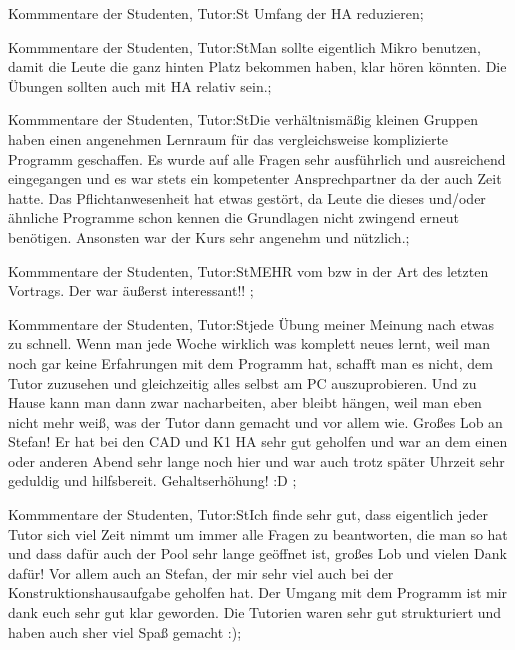 \documentclass[10pt]{beamer}
\begin{document}
\begin{frame}[fragile]{Kommmentare der Studenten, Tutor:St}  Umfang der HA reduzieren;
 \end{frame}
\begin{frame}[fragile]{Kommmentare der Studenten, Tutor:St}Man sollte eigentlich Mikro benutzen, damit die Leute die ganz hinten Platz bekommen haben, klar hören könnten. Die Übungen sollten auch mit HA relativ sein.;
 \end{frame}
\begin{frame}[fragile]{Kommmentare der Studenten, Tutor:St}Die verhältnismäßig kleinen Gruppen  haben einen angenehmen Lernraum für das vergleichsweise komplizierte Programm geschaffen. Es wurde auf alle Fragen sehr ausführlich und ausreichend eingegangen und es war stets ein kompetenter Ansprechpartner da der auch Zeit hatte. Das Pflichtanwesenheit hat etwas gestört, da Leute die dieses und/oder ähnliche Programme schon kennen die Grundlagen nicht zwingend erneut benötigen. Ansonsten war der Kurs sehr angenehm und nützlich.;
 \end{frame}
\begin{frame}[fragile]{Kommmentare der Studenten, Tutor:St}MEHR vom bzw in der Art des letzten Vortrags. Der war äußerst interessant!! ;
 \end{frame}
\begin{frame}[fragile]{Kommmentare der Studenten, Tutor:St}jede Übung meiner Meinung nach etwas zu schnell. Wenn man jede Woche wirklich was komplett neues lernt, weil man noch gar keine Erfahrungen mit dem Programm hat, schafft man es nicht, dem Tutor zuzusehen und gleichzeitig alles selbst am PC auszuprobieren. Und zu Hause kann man dann zwar nacharbeiten, aber bleibt hängen, weil man eben nicht mehr weiß, was der Tutor dann gemacht und vor allem wie.  Großes Lob an Stefan! Er hat bei den CAD und K1 HA sehr gut geholfen und war an dem einen oder anderen Abend sehr lange noch hier und war auch trotz später Uhrzeit sehr geduldig und hilfsbereit.  Gehaltserhöhung! :D ;
 \end{frame}
\begin{frame}[fragile]{Kommmentare der Studenten, Tutor:St}Ich finde sehr gut, dass eigentlich jeder Tutor sich viel Zeit nimmt um immer alle Fragen zu beantworten, die man so hat und dass dafür auch der Pool sehr lange geöffnet ist, großes Lob und vielen Dank dafür! Vor allem auch an Stefan, der mir sehr viel auch bei der Konstruktionshausaufgabe geholfen hat.  Der Umgang mit dem Programm ist mir dank euch sehr gut klar geworden. Die Tutorien waren sehr gut strukturiert und haben auch sher viel Spaß gemacht :);
 \end{frame}
\end{document}
